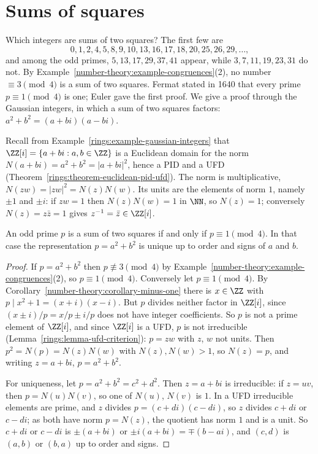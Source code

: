 \section{Sums of squares}\label{number-theory:section-squares}

Which integers are sums of two squares? The first few are
\[
0, 1, 2, 4, 5, 8, 9, 10, 13, 16, 17, 18, 20, 25, 26, 29, \ldots,
\]
and among the odd primes, $5, 13, 17, 29, 37, 41$ appear, while $3, 7, 11, 19, 23, 31$ do not. By Example~\ref{number-theory:example-congruences}(2), no number $\equiv 3 \pmod 4$ is a sum of two squares.
Fermat stated in 1640 that every prime $p \equiv 1 \pmod 4$ is one; Euler gave the first proof. We give a proof through the Gaussian integers, in which a sum of two squares factors:
$a^2 + b^2 = (a + bi)(a - bi)$.

Recall from Example~\ref{rings:example-gaussian-integers} that $\ZZ[i] = \{a + bi : a, b \in \ZZ\}$ is a Euclidean domain for the norm $N(a + bi) = a^2 + b^2 = |a + bi|^2$, hence a PID and a UFD
(Theorem~\ref{rings:theorem-euclidean-pid-ufd}). The norm is multiplicative, $N(zw) = |zw|^2 = N(z)N(w)$. Its units are the elements of norm $1$, namely $\pm1$ and $\pm i$: if $zw = 1$ then
$N(z)N(w) = 1$ in $\NN$, so $N(z) = 1$; conversely $N(z) = z\bar{z} = 1$ gives $z^{-1} = \bar{z} \in \ZZ[i]$.

\begin{theorem}[Fermat]\label{number-theory:theorem-fermat-two-squares}
An odd prime $p$ is a sum of two squares if and only if $p \equiv 1 \pmod 4$. In that case the representation $p = a^2 + b^2$ is unique up to order and signs of $a$ and $b$.
\end{theorem}

\begin{proof}
If $p = a^2 + b^2$ then $p \not\equiv 3 \pmod 4$ by Example~\ref{number-theory:example-congruences}(2), so $p \equiv 1 \pmod 4$. Conversely let $p \equiv 1 \pmod 4$. By
Corollary~\ref{number-theory:corollary-minus-one} there is $x \in \ZZ$ with $p \mid x^2 + 1 = (x + i)(x - i)$. But $p$ divides neither factor in $\ZZ[i]$, since $(x \pm i)/p = x/p \pm i/p$ does not have
integer coefficients. So $p$ is not a prime element of $\ZZ[i]$, and since $\ZZ[i]$ is a UFD, $p$ is not irreducible (Lemma~\ref{rings:lemma-ufd-criterion}): $p = zw$ with $z$, $w$ not units. Then
$p^2 = N(p) = N(z)N(w)$ with $N(z), N(w) > 1$, so $N(z) = p$, and writing $z = a + bi$, $p = a^2 + b^2$.

For uniqueness, let $p = a^2 + b^2 = c^2 + d^2$. Then $z = a + bi$ is irreducible: if $z = uv$, then $p = N(u)N(v)$, so one of $N(u)$, $N(v)$ is $1$. In a UFD irreducible elements are prime, and $z$
divides $p = (c + di)(c - di)$, so $z$ divides $c + di$ or $c - di$; as both have norm $p = N(z)$, the quotient has norm $1$ and is a unit. So $c + di$ or $c - di$ is $\pm(a + bi)$ or
$\pm i(a + bi) = \mp(b - ai)$, and $(c, d)$ is $(a, b)$ or $(b, a)$ up to order and signs.
\end{proof}


